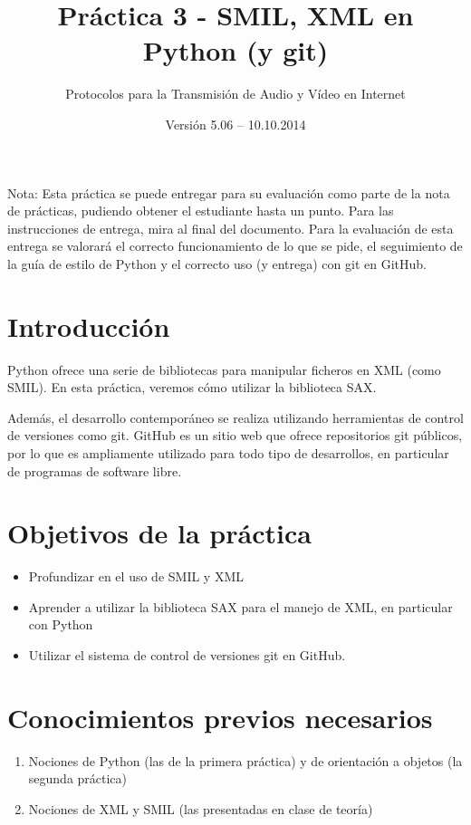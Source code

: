 \documentclass[11pt,a4paper]{article}
\begin{document}
\title{Práctica 3 - SMIL, XML en Python (y git)}
\author{Protocolos para la Transmisión de Audio y Vídeo en Internet}
\date{Versión 5.06 – 10.10.2014}


\maketitle


Nota: Esta práctica se puede entregar para su evaluación como parte de la nota de prácticas, pudiendo obtener el estudiante hasta un punto. Para las instrucciones de entrega, mira al final del documento. Para la evaluación de esta entrega se valorará el correcto funcionamiento de lo que se pide, el seguimiento de la guía de estilo de Python y el correcto uso (y entrega) con git en GitHub.

\section{Introducción}

Python ofrece una serie de bibliotecas para manipular ficheros en XML (como SMIL). En esta práctica, veremos cómo utilizar la biblioteca SAX.

Además, el desarrollo contemporáneo se realiza utilizando herramientas de control de versiones como git. GitHub es un sitio web que ofrece repositorios git públicos, por lo que es ampliamente utilizado para todo tipo de desarrollos, en particular de programas de software libre.

\section{Objetivos de la práctica}

\begin{itemize}
  \item Profundizar en el uso de SMIL y XML
  \item Aprender a utilizar la biblioteca SAX para el manejo de XML, en particular con Python
  \item Utilizar el sistema de control de versiones git en GitHub.
\end{itemize}

\section{Conocimientos previos necesarios}

\begin{enumerate}
  \item Nociones de Python (las de la primera práctica) y de orientación a objetos (la segunda práctica)
  \item Nociones de XML y SMIL (las presentadas en clase de teoría)
\end{enumerate}
\end{document}
